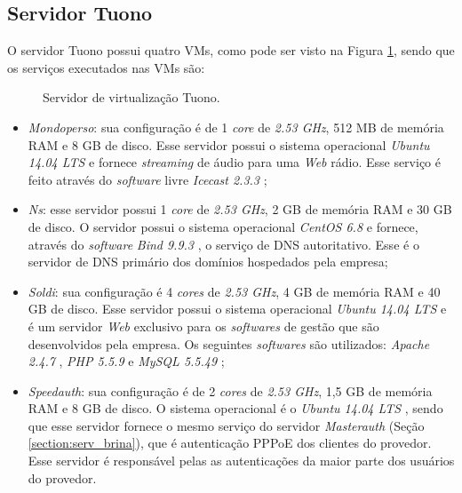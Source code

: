 \subsection{Servidor Tuono}
\label{section:serv_tuono}

O servidor Tuono possui quatro \ac{VM}s, como pode ser visto na Figura \ref{fig:servidor_tuono}, sendo que os serviços executados nas \ac{VM}s são:

\begin{figure}[h!]
 \centering
 \caption{Servidor de virtualização Tuono.}
 \label{fig:servidor_tuono}
\end{figure}

\begin{itemize}
 \item \textit{Mondoperso}: sua configuração é de 1 \textit{core} de \textit{2.53 GHz}, 512 MB de memória \ac{RAM} e 8 GB de disco. 
 Esse servidor possui o sistema operacional \textit{Ubuntu 14.04 \ac{LTS}} \cite{ubuntu} e fornece \textit{streaming} de áudio para uma 
 \textit{Web} rádio. Esse serviço é feito através do \textit{software} livre \textit{Icecast 2.3.3} \cite{icecast};
 
 \item \textit{Ns}: esse servidor possui 1 \textit{core} de \textit{2.53 GHz}, 2 GB de memória \ac{RAM} e 30 GB de disco. O servidor possui o sistema 
 operacional \textit{CentOS 6.8} \cite{centos} e fornece, através do \textit{software} \textit{Bind 9.9.3} \cite{bind}, o serviço de \ac{DNS} 
 autoritativo. Esse é o servidor de \ac{DNS} primário dos domínios hospedados pela empresa;

 \item \textit{Soldi}: sua configuração é 4 \textit{cores} de \textit{2.53 GHz}, 4 GB de memória \ac{RAM} e 40 GB de disco. 
 Esse servidor possui o sistema operacional \textit{Ubuntu 14.04 \ac{LTS}} \cite{ubuntu} e é um servidor \textit{Web} exclusivo para os
 \textit{softwares} de gestão que são desenvolvidos pela empresa. Os seguintes \textit{softwares} são utilizados: \textit{Apache 2.4.7} 
 \cite{apache}, \textit{\ac{PHP} 5.5.9} \cite{php} e \textit{MySQL 5.5.49} \cite{mysql};

 \item \textit{Speedauth}: sua configuração é de 2 \textit{cores} de \textit{2.53 GHz}, 1,5 GB de memória \ac{RAM} e 8 GB de disco. 
 O sistema operacional é o \textit{Ubuntu 14.04 \ac{LTS}} \cite{ubuntu}, sendo que esse servidor fornece o mesmo serviço do servidor 
 \textit{Masterauth} (Seção \ref{section:serv_brina}), que é autenticação \ac{PPPoE} dos clientes do provedor. Esse servidor é responsável pelas 
 as autenticações da maior parte dos usuários do provedor.
\end{itemize}

